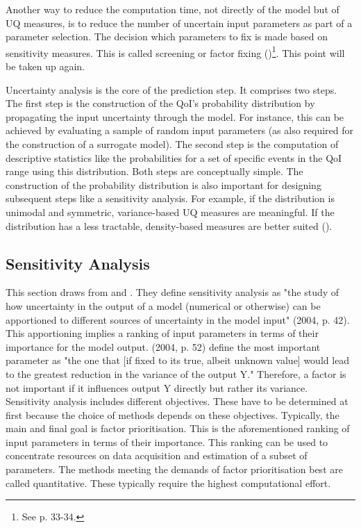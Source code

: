 Another way to reduce the computation time, not directly of the model but of UQ measures, is to reduce the number of uncertain input parameters as part of a parameter selection. The decision which parameters to fix is made based on sensitivity measures. This is called screening or factor fixing (\cite{Saltelli.2008})\footnote{See p. 33-34.}. This point will be taken up again.

Uncertainty analysis is the core of the prediction step. It comprises two steps. The first step is the construction of the QoI's probability distribution by propagating the input uncertainty through the model. For instance, this can be achieved by evaluating a sample of random input parameters (as also required for the construction of a surrogate model). The second step is the computation of descriptive statistics like the probabilities for a set of specific events in the QoI range using this distribution. Both steps are conceptually simple. The construction of the probability distribution is also important for designing subsequent steps like a sensitivity analysis. For example, if the distribution is unimodal and symmetric, variance-based UQ measures are meaningful. If the distribution has a less tractable, density-based measures are better suited (\cite{plischke2013global}).


\subsection{Sensitivity Analysis}


This section draws from \cite{Saltelli.2004} and \cite{Saltelli.2008}.
They define sensitivity analysis as "the study of how uncertainty in the output of a model (numerical or otherwise) can be apportioned to different sources of uncertainty in the model input" \citeauthor{Saltelli.2004} (2004, p. 42). This apportioning implies a ranking of input parameters in terms of their importance for the model output. \citeauthor{Saltelli.2004} (2004, p. 52) define the most important parameter as "the one that [if fixed to its true, albeit unknown value]
would lead to the greatest reduction in the variance of the output Y." Therefore, a factor is not important if it influences output Y directly but rather its variance.\\

\noindent
Sensitivity analysis includes different objectives. These have to be determined at first because the choice of methods depends on these objectives. Typically, the main and final goal is factor prioritisation. This is the aforementioned ranking of input parameters in terms of their importance. This ranking can be used to concentrate resources on data acquisition and estimation of a subset of parameters. The methods meeting the demands of factor prioritisation best are called quantitative. These typically require the highest computational effort.

